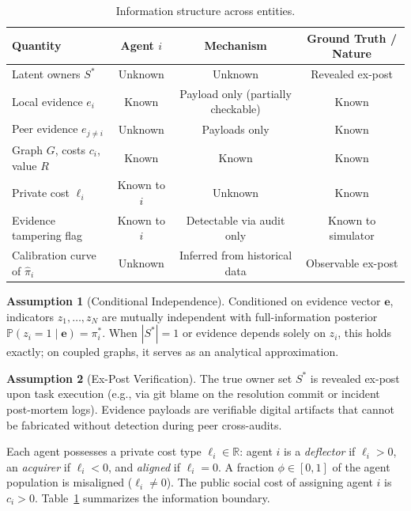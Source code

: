\documentclass{article}
\theoremstyle{definition}
\newtheorem{assumption}{Assumption}
\begin{document}
\begin{table}[t]
\centering
\small
\caption{Information structure across entities.}
\label{tab:info_structure}
\begin{tabular}{lccc}
\toprule
\textbf{Quantity} & \textbf{Agent $i$} & \textbf{Mechanism} & \textbf{Ground Truth / Nature} \\
\midrule
Latent owners $S^*$ & Unknown & Unknown & Revealed ex-post \\
Local evidence $e_i$ & Known & Payload only (partially checkable) & Known \\
Peer evidence $e_{j \neq i}$ & Unknown & Payloads only & Known \\
Graph $G$, costs $c_i$, value $R$ & Known & Known & Known \\
Private cost $\ell_i$ & Known to $i$ & Unknown & Known \\
Evidence tampering flag & Known to $i$ & Detectable via audit only & Known to simulator \\
Calibration curve of $\hat{\pi}_i$ & Unknown & Inferred from historical data & Observable ex-post \\
\bottomrule
\end{tabular}
\end{table}

\begin{assumption}[Conditional Independence]
\label{ass:cond_indep}
Conditioned on evidence vector $\mathbf{e}$, indicators $z_1, \dots, z_N$ are mutually independent with full-information posterior $\mathbb{P}(z_i = 1 \mid \mathbf{e}) = \pi_i^*$. When $|S^*| = 1$ or evidence depends solely on $z_i$, this holds exactly; on coupled graphs, it serves as an analytical approximation.
\end{assumption}

\begin{assumption}[Ex-Post Verification]
\label{ass:ex_post}
The true owner set $S^*$ is revealed ex-post upon task execution (e.g., via git blame on the resolution commit or incident post-mortem logs). Evidence payloads are verifiable digital artifacts that cannot be fabricated without detection during peer cross-audits.
\end{assumption}

Each agent possesses a private cost type $\ell_i \in \mathbb{R}$: agent $i$ is a \emph{deflector} if $\ell_i > 0$, an \emph{acquirer} if $\ell_i < 0$, and \emph{aligned} if $\ell_i = 0$. A fraction $\phi \in [0, 1]$ of the agent population is misaligned ($\ell_i \neq 0$). The public social cost of assigning agent $i$ is $c_i > 0$. Table~\ref{tab:info_structure} summarizes the information boundary.
\end{document}
